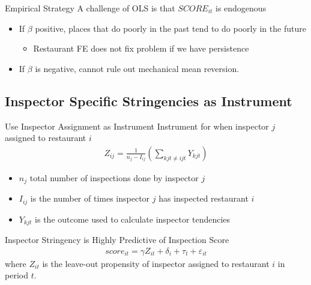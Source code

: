 \documentclass[handout]{beamer}
\begin{document}
\begin{frame}{Empirical Strategy}
A challenge of OLS is that $SCORE_{it}$ is endogenous
\begin{itemize}
\item If $\beta$ positive, places that do poorly in the past tend to do poorly in the future
\begin{itemize}
\item Restaurant FE does not fix problem if we have persistence
\end{itemize}
\item If $\beta$ is negative, cannot rule out mechanical mean reversion.  
\end{itemize}
\end{frame}

\subsection{Inspector Specific Stringencies as Instrument}
\begin{frame}{Use Inspector Assignment as Instrument}
Instrument for when inspector $j$ assigned to restaurant $i$
    \begin{align*}
        Z_{ij} = \frac{1}{n_j - I_{ij}} \left( \sum_{kjt\neq ijt}   Y_{kjt}\right)
    \end{align*}
    \begin{itemize}
    \item $n_j$ total number of inspections done by inspector $j$
    \item $I_{ij}$ is the number of times inspector $j$ has inspected restaurant $i$
    \item $Y_{kjt}$ is the outcome used to calculate inspector tendencies
    \end{itemize}
\end{frame}

\begin{frame}{Inspector Stringency is Highly Predictive of Inspection Score}
\begin{align*}
    score_{it} = \gamma Z_{it} + \delta_i + \tau_t + \varepsilon_{it}
\end{align*}
\footnotesize{where $Z_{it}$ is the leave-out propensity of inspector assigned to restaurant $i$ in period $t$.}
\begin{table}[h!]
\centering
\scalebox{0.8}{ }
\label{first_stage_reg}
\end{table}
\end{frame}
\end{document}
